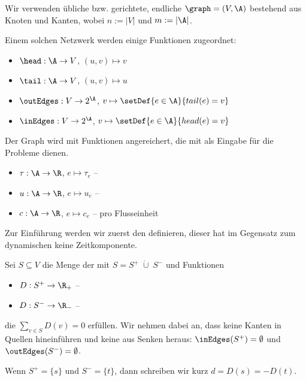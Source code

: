 \begin{definition}
    Wir verwenden übliche  bzw. gerichtete, endliche 
    $\graph = (V, \A)$ bestehend aus Knoten und Kanten,
    wobei $n := |V|$ und $m := |\A|$.
    
    Einem solchen Netzwerk werden einige Funktionen zugeordnet:
    \begin{itemize}
        \item $\head : \A \rightarrow V$, $(u,v) \mapsto v$
        \item $\tail : \A \rightarrow V$, $(u,v) \mapsto u$
        \item $\outEdges : V \rightarrow 2^\A$,
            $v \mapsto \setDef{e \in \A}{tail(e) = v}$
        \item $\inEdges : V \rightarrow 2^\A$,
            $v \mapsto \setDef{e \in \A}{head(e) = v}$
    \end{itemize}
    
    Der Graph wird mit Funktionen angereichert, die mit als Eingabe
    für die Probleme dienen.
    \begin{itemize}
        \item $\tau : \A \rightarrow \R$, $e \mapsto \tau_e$ -- 
        \item $u : \A \rightarrow \R$, $e \mapsto u_e$ -- 
        \item $c : \A \rightarrow \R$, $e \mapsto c_e$
            --  pro Flusseinheit
    \end{itemize}
\end{definition}

Zur Einführung werden wir zuerst den  definieren, dieser
hat im Gegensatz zum dynamischen keine Zeitkomponente.

\begin{definition}
    Sei $S \subseteq V$ die Menge der  mit $S = S^+ \;\dot{\cup}\; S^-$
    und Funktionen
    \begin{itemize}
        \item $D : S^+ \rightarrow \R_+$ -- 
        \item $D : S^- \rightarrow \R_-$ -- 
    \end{itemize}
    die $\sum_{v \in S} D(v) = 0$ erfüllen. Wir nehmen dabei an, dass keine Kanten in
    Quellen hineinführen und keine aus Senken heraus: $\inEdges(S^+) = \emptyset$ und
    $\outEdges(S^-) = \emptyset$.
    
    Wenn $S^+ = \{s\}$ und $S^- = \{t\}$, dann schreiben wir kurz $d = D(s) = -D(t)$.
\end{definition}

